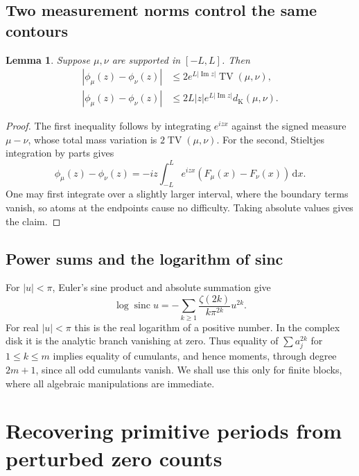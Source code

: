 \documentclass[11pt,a4paper]{article}
\numberwithin{equation}{section}
\newtheorem{lemma}[theorem]{Lemma}
\theoremstyle{definition}
\theoremstyle{remark}
\DeclareMathOperator{\TV}{TV}
\DeclareMathOperator{\sinc}{sinc}
\newcommand{\dd}{\,\mathrm d}
\newcommand{\distK}{d_{\mathrm K}}
\begin{document}
\subsection{Two measurement norms control the same contours}

\begin{lemma}\label{lem:measurement}
Suppose $\mu,\nu$ are supported in $[-L,L]$. Then
\begin{align}
 |\phi_\mu(z)-\phi_\nu(z)|
 &\le2e^{L|\operatorname{Im}z|}\TV(\mu,\nu),
 \label{eq:tv-entire}\\
 |\phi_\mu(z)-\phi_\nu(z)|
 &\le2L|z|e^{L|\operatorname{Im}z|}\distK(\mu,\nu).
 \label{eq:ks-entire}
\end{align}
\end{lemma}
\begin{proof}
The first inequality follows by integrating $e^{izx}$ against the signed
measure $\mu-\nu$, whose total mass variation is $2\TV(\mu,\nu)$.
For the second, Stieltjes integration by parts gives
\[
 \phi_\mu(z)-\phi_\nu(z)
 =-iz\int_{-L}^{L}e^{izx}(F_\mu(x)-F_\nu(x))\dd x.
\]
One may first integrate over a slightly larger interval, where the boundary
terms vanish, so atoms at the endpoints cause no difficulty. Taking absolute
values gives the claim.
\end{proof}

\subsection{Power sums and the logarithm of sinc}

For $|u|<\pi$, Euler's sine product and absolute summation give
\begin{equation}
 \log\sinc u
 =-\sum_{k\ge1}\frac{\zeta(2k)}{k\pi^{2k}}u^{2k}.
 \label{eq:log-sinc}
\end{equation}
For real $|u|<\pi$ this is the real logarithm of a positive number. In the
complex disk it is the analytic branch vanishing at zero. Thus equality of
$\sum a_j^{2k}$ for $1\le k\le m$ implies equality of cumulants, and hence
moments, through degree $2m+1$, since all odd cumulants vanish. We shall use
this only for finite blocks, where all algebraic manipulations are immediate.

\section{Recovering primitive periods from perturbed zero counts}
\label{sec:periods}
\end{document}
